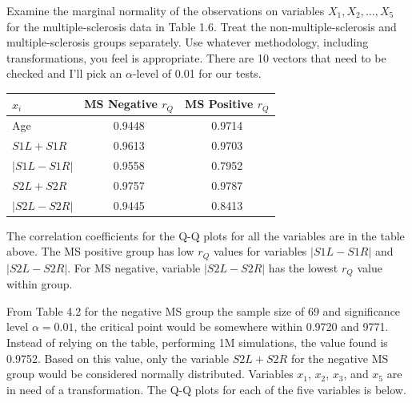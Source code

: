 Examine the marginal normality of the observations on variables $X_{1}, X_{2}, \dots, X_{5}$ for the
multiple-sclerosis data in Table 1.6. Treat the non-multiple-sclerosis and multiple-sclerosis
groups separately. Use whatever methodology, including transformations, you feel is appropriate.
\newline There are 10 vectors that need to be checked and I'll pick an $\alpha\text{-level}$ of 0.01 for our tests.
\begin{center}
    \begin{tabular}{lcc}
        \hline %
        $x_{i}$ & MS Negative $r_{Q}$ & MS Positive $r_{Q}$ \\
        \hline %
        Age                      & 0.9448 & 0.9714 \\
        $S1L + S1R$              & 0.9613 & 0.9703 \\
        $\left|S1L - S1R\right|$ & 0.9558 & 0.7952 \\
        $S2L + S2R$              & 0.9757 & 0.9787 \\
        $\left|S2L - S2R\right|$ & 0.9445 & 0.8413 \\
        \hline %
    \end{tabular}
\end{center}
The correlation coefficients for the Q-Q plots for all the variables are in the table above. The MS positive group has low $r_{Q}$ values for variables $\left|S1L - S1R\right|$ and $\left|S2L - S2R\right|$. For MS negative, variable $\left|S2L - S2R\right|$ has the lowest $r_{Q}$ value within group.

From Table 4.2 for the negative MS group the sample size of 69 and significance level $\alpha = 0.01$, the critical point would be somewhere within 0.9720 and 9771. Instead of relying on the table, performing 1M simulations, the value found is 0.9752. Based on this value, only the variable $S2L + S2R$ for the negative MS group would be considered normally distributed. Variables $x_{1}$, $x_{2}$, $x_{3}$, and $x_{5}$ are in need of a transformation. The Q-Q plots for each of the five variables is below.

